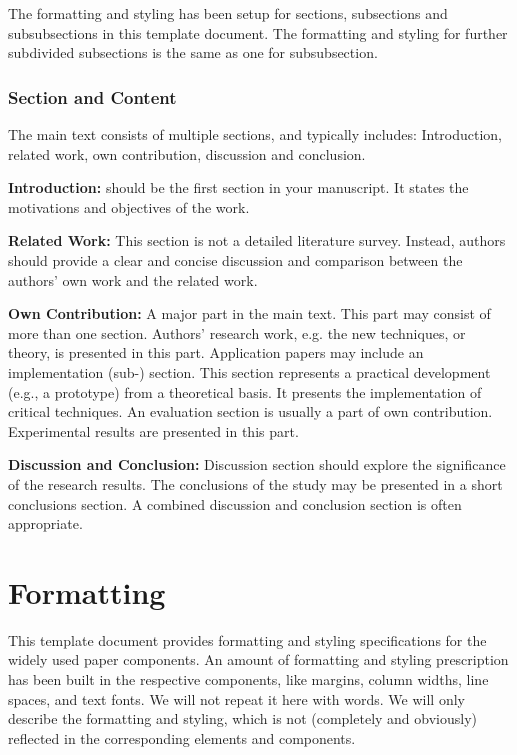 \documentclass{ronpub}  %
\begin{document}
The formatting and styling has been setup for sections, subsections and subsubsections in this template document. The formatting and styling for further subdivided subsections is the same as one for subsubsection.

\subsubsection{Section and Content}

The main text consists of multiple sections, and typically includes: Introduction, related work, own contribution, discussion and conclusion.

\textbf{Introduction:} should be the first section in your manuscript. It states the motivations and objectives of the work.

\textbf{Related Work:} This section is not a detailed literature survey. Instead, authors should provide a clear and concise discussion and comparison between the authors' own work and the related work.

\textbf{Own Contribution:} A major part in the main text. This part may consist of more than one section. Authors' research work, e.g. the new techniques, or theory, is presented in this part. Application papers may include an implementation (sub-) section. This section represents a practical development (e.g., a prototype) from a theoretical basis. It presents the implementation of critical techniques. An evaluation section is usually a part of own contribution. Experimental results are presented in this part.

\textbf{Discussion and Conclusion:} Discussion section should explore the significance of the research results. The conclusions of the study may be presented in a short conclusions section. A combined discussion and conclusion section is often appropriate.

\section{Formatting}

This template document provides formatting and styling specifications for the widely used paper components. An amount of formatting and styling prescription has been built in the respective components, like margins, column widths, line spaces, and text fonts. We will not repeat it here with words. We will only describe the formatting and styling, which is not (completely and obviously) reflected in the corresponding elements and components.
\end{document}
